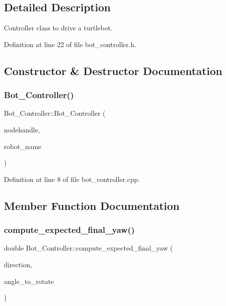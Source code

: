 \subsection{Detailed Description}
Controller class to drive a turtlebot. 

Definition at line 22 of file bot\+\_\+controller.\+h.



\subsection{Constructor \& Destructor Documentation}
\mbox{\label{class_bot___controller_a05104e1b41f7c9cd9cdfe80bbbd53a7d}} 
\subsubsection{\texorpdfstring{Bot\+\_\+\+Controller()}{Bot\_Controller()}}
{\footnotesize\ttfamily Bot\+\_\+\+Controller\+::\+Bot\+\_\+\+Controller (\begin{DoxyParamCaption}\item[{ros\+::\+Node\+Handle $\ast$}]{nodehandle,  }\item[{const std\+::string \&}]{robot\+\_\+name }\end{DoxyParamCaption})}



Definition at line 8 of file bot\+\_\+controller.\+cpp.



\subsection{Member Function Documentation}
\mbox{\label{class_bot___controller_a836b1e434c1c15ccec0b81313a32aca8}} 
\subsubsection{\texorpdfstring{compute\+\_\+expected\+\_\+final\+\_\+yaw()}{compute\_expected\_final\_yaw()}}
{\footnotesize\ttfamily double Bot\+\_\+\+Controller\+::compute\+\_\+expected\+\_\+final\+\_\+yaw (\begin{DoxyParamCaption}\item[{bool}]{direction,  }\item[{double}]{angle\+\_\+to\+\_\+rotate }\end{DoxyParamCaption})\hspace{0.3cm}{\ttfamily [pure virtual]}}




